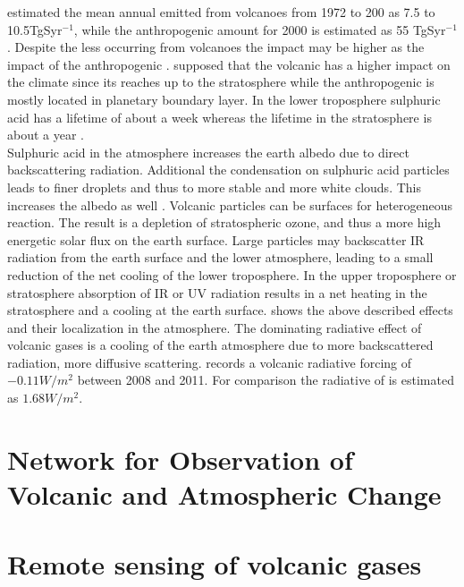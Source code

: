 \documentclass  [
  paper    = a4,
  BCOR     = 10mm,
  twoside,
  fontsize = 12pt,
  fleqn,
  toc      = bibnumbered,
  toc      = listofnumbered,
  numbers  = noendperiod,
  headings = normal,
  listof   = leveldown,
  version  = 3.03
]                                       {scrreprt}
\begin{document}
	\citet{halmer2002annual} estimated the mean annual   emitted from volcanoes from 1972 to 200 as 7.5 to 10.5TgSyr$^{-1}$, while the anthropogenic   amount for 2000 is estimated as 55 TgSyr$^{-1}$ \citep{IPCC}. Despite the less   occurring from volcanoes the impact may be higher as the impact of the anthropogenic . \citet{graf1997volcanic} supposed that the volcanic   has a higher impact on the climate since its reaches up to the stratosphere while the anthropogenic   is mostly located in planetary boundary layer. In the lower troposphere sulphuric acid has a lifetime of about a week whereas the lifetime in the stratosphere is about a year \citep{IPCC}.\\
	Sulphuric acid in the atmosphere increases the earth albedo due to direct backscattering radiation. Additional the condensation on sulphuric acid particles leads to finer droplets and thus to more stable and more white clouds. This increases the albedo as well \citep{twomey1974pollution}.
	Volcanic particles can be surfaces for heterogeneous reaction. The result is a depletion of stratospheric ozone, and thus a more high energetic solar flux on the earth surface.
	Large particles may backscatter IR radiation from the earth surface and the lower atmosphere, leading to a small reduction of the net cooling of the lower troposphere.
	In the upper troposphere or stratosphere absorption of IR or UV radiation results in a net heating in the stratosphere and a cooling at the earth surface.
	 shows the above described effects and their localization in the atmosphere.
	The dominating radiative effect of volcanic gases is a cooling of the earth atmosphere due to  more backscattered radiation, more diffusive scattering\citep{robock2000volcanic}.
	\citet{IPCC} records a volcanic radiative forcing of $-0.11W/m^{2}$ between 2008 and 2011. For comparison the radiative of   is estimated as  $1.68W/m^{2}$.
	
	\chapter{Network for Observation of Volcanic and Atmospheric Change \label{NOVAC}}
%	
	
%
	\chapter{Remote sensing of volcanic gases}
\end{document}
